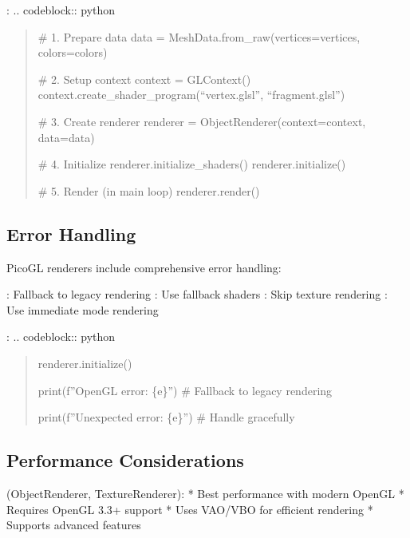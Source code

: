 \documentclass[a4paper,10pt,english,openany,oneside]{sphinxmanual}
\begin{document}
\sphinxAtStartPar
{}:
.. code\sphinxhyphen{}block:: python
\begin{quote}

\sphinxAtStartPar
\# 1. Prepare data
data = MeshData.from\_raw(vertices=vertices, colors=colors)

\sphinxAtStartPar
\# 2. Setup context
context = GLContext()
context.create\_shader\_program(“vertex.glsl”, “fragment.glsl”)

\sphinxAtStartPar
\# 3. Create renderer
renderer = ObjectRenderer(context=context, data=data)

\sphinxAtStartPar
\# 4. Initialize
renderer.initialize\_shaders()
renderer.initialize()

\sphinxAtStartPar
\# 5. Render (in main loop)
renderer.render()
\end{quote}


\subsection{Error Handling}
\label{\detokenize{api/renderer:error-handling}}
\sphinxAtStartPar
PicoGL renderers include comprehensive error handling:

\sphinxAtStartPar
{}: Fallback to legacy rendering
: Use fallback shaders
: Skip texture rendering
: Use immediate mode rendering

\sphinxAtStartPar
{}:
.. code\sphinxhyphen{}block:: python
\begin{quote}
\begin{description}
\sphinxAtStartPar
renderer.initialize()

\sphinxAtStartPar
print(f”OpenGL error: \{e\}”)
\# Fallback to legacy rendering

\sphinxAtStartPar
print(f”Unexpected error: \{e\}”)
\# Handle gracefully

\end{description}
\end{quote}


\subsection{Performance Considerations}
\label{\detokenize{api/renderer:performance-considerations}}
\sphinxAtStartPar
{} (ObjectRenderer, TextureRenderer):
* Best performance with modern OpenGL
* Requires OpenGL 3.3+ support
* Uses VAO/VBO for efficient rendering
* Supports advanced features
\end{document}
